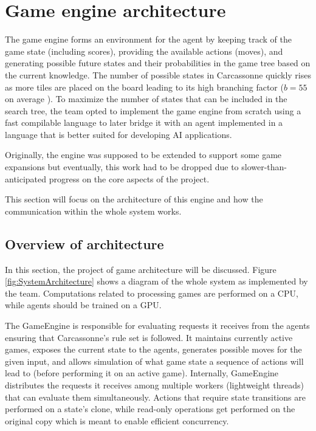 \section{Game engine architecture}
The game engine forms an environment for the agent by keeping track of the game state
(including scores), providing the available actions (moves), and generating possible
future states and their probabilities in the game tree based on the current knowledge.
The number of possible states in Carcassonne quickly rises as more tiles are placed on
the board leading to its high branching factor ($b = 55$ on average \cite{MasterThesisCarcassonne}).
To maximize the number of states that can be included in the search tree,
the team opted to implement the game engine from scratch using a fast compilable
language to later bridge it with an agent implemented in a language
that is better suited for developing AI applications.

Originally, the engine was supposed to be extended to support some game expansions
but eventually, this work had to be dropped due to slower-than-anticipated progress on
the core aspects of the project.

This section will focus on the architecture of this engine and how the communication within the whole system works.

\subsection{Overview of architecture}

In this section, the project of game architecture will be discussed.
Figure \ref{fig:SystemArchitecture} shows a diagram of the whole system as implemented by the team.
Computations related to processing games are performed on a CPU,
while agents should be trained on a GPU.

\begin{figure*}
	\centering
	\scalebox{.48}{}
	\caption{Diagram of the system's architecture}
	\label{fig:SystemArchitecture}
\end{figure*}

The GameEngine is responsible for evaluating requests it receives from the agents
ensuring that Carcassonne's rule set is followed. It maintains currently active games,
exposes the current state to the agents, generates possible moves for the given input,
and allows simulation of what game state a sequence of actions will lead to (before performing it
on an active game). Internally, GameEngine distributes the requests it receives among
multiple workers (lightweight threads) that can evaluate them simultaneously. Actions that
require state transitions are performed on a state's clone, while read-only operations
get performed on the original copy which is meant to enable efficient concurrency.

